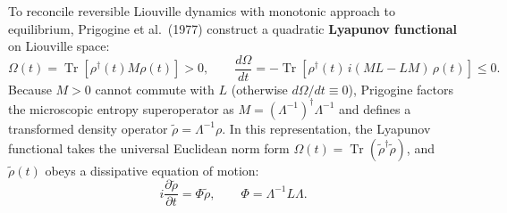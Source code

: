 \documentclass[11pt,a4paper]{article}
\begin{document}
To reconcile reversible Liouville dynamics with monotonic approach to equilibrium, Prigogine et al.\ (1977) construct a quadratic \textbf{Lyapunov functional} on Liouville space:
\begin{equation}
\Omega(t) = \operatorname{Tr}\left[\rho^\dagger(t) M \rho(t)\right] > 0, \qquad \frac{d\Omega}{dt} = -\operatorname{Tr}\left[\rho^\dagger(t) \, i(ML - LM) \, \rho(t)\right] \le 0.
\end{equation}
Because $M > 0$ cannot commute with $L$ (otherwise $d\Omega/dt \equiv 0$), Prigogine factors the microscopic entropy superoperator as $M = (\Lambda^{-1})^\dagger \Lambda^{-1}$ and defines a transformed density operator $\tilde{\rho} = \Lambda^{-1}\rho$. In this representation, the Lyapunov functional takes the universal Euclidean norm form $\Omega(t) = \operatorname{Tr}(\tilde{\rho}^\dagger \tilde{\rho})$, and $\tilde{\rho}(t)$ obeys a dissipative equation of motion:
\begin{equation}
i\frac{\partial \tilde{\rho}}{\partial t} = \Phi \tilde{\rho}, \qquad \Phi = \Lambda^{-1} L \Lambda.
\end{equation}
\end{document}
